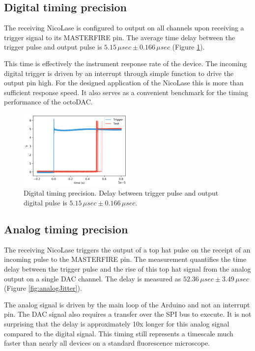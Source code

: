 \documentclass[10pt,a4paper]{article}
\begin{document}
\subsection{Digital timing precision}
The receiving NicoLase is configured to output on all channels upon receiving a trigger signal to its MASTERFIRE pin.  The average time delay between the trigger pulse and output pulse is $5.15\,\mu sec \pm 0.166\,\mu sec$ (Figure \ref{fig:digitalJitter}).

This time is effectively the instrument response rate of the device.  The incoming digital trigger is driven by an interrupt through simple function to drive the output pin high.  For the designed application of the NicoLase this is more than sufficient response speed.  It also serves as a convenient benchmark for the timing performance of the octoDAC. 

\begin{figure}
	\centering
	\includegraphics[width=0.5\textwidth]{../output/digitalJitter.png}
	\caption[digitalJitter]{Digital timing precision. Delay between trigger pulse and output digital pulse is $5.15\, \mu sec \pm 0.166\, \mu sec$.\newline}
	\label{fig:digitalJitter}
\end{figure}   

\subsection{Analog timing precision}

The receiving NicoLase triggers the output of a top hat pulse on the receipt of an incoming pulse to the MASTERFIRE pin.  The measurement quantifies the time delay between the trigger pulse and the rise of this top hat signal from the analog output on a single DAC channel.  The delay is measured as $52.36\,\mu sec \pm 3.49\, \mu sec$ (Figure \ref{fig:analogJitter}).

The analog signal is driven by the main loop of the Arduino and not an interrupt pin.  The DAC signal also requires a transfer over the SPI bus to execute.  It is not surprising that the delay is approximately 10x longer for this analog signal compared to the digital signal.  This timing still represents a timescale much faster than nearly all devices on a standard fluorescence microscope. 
\end{document}
